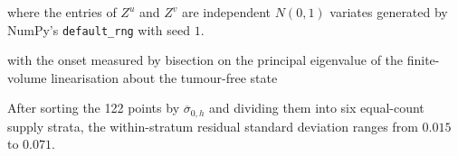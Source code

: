 
where the entries of $Z^u$ and $Z^v$ are independent $N(0,1)$ variates
generated by NumPy's \texttt{default\_rng} with seed $1$.


with the onset measured by bisection on the principal eigenvalue of the
finite-volume linearisation about the tumour-free state

After sorting the 122 points by $\overline{\sigma}_{0,h}$ and dividing them
into six equal-count supply strata, the within-stratum residual standard
deviation ranges from $0.015$ to $0.071$.

